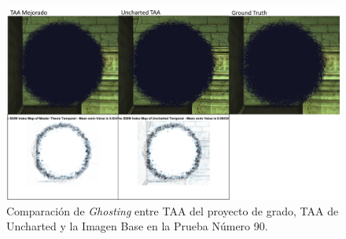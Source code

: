 \documentclass[pregrado]{tesis-usb} %
\begin{document}
\begin{figure}[!htb]
	\centering
	\includegraphics[scale=0.8]{images/results/hairball_ghosting_shadow.png}
	\caption{Comparación de \textit{Ghosting} entre TAA del proyecto de grado, TAA de Uncharted y la Imagen Base en la Prueba Número 90.}\label{fig:hairball_ghosting_shadow}
\end{figure}

\FloatBarrier
\end{document}
